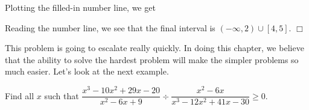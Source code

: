 \documentclass[lang=en,11pt]{elegantbook}
\begin{document}
\begin{solution}
Plotting the filled-in number line, we get 
\begin{figure}[!h]
    \centering
\end{figure}

Reading the number line, we see that the final interval is $(-\infty,2)\cup[4,5]$. $\Box$
\end{solution}
This problem is going to escalate really quickly.  In doing this chapter, we believe that the ability to solve the hardest problem will make the simpler problems so much easier.  Let's look at the next example.
\begin{example}
Find all $x$ such that $\dfrac{x^3-10x^2+29x-20}{x^2-6x+9}\div\dfrac{x^2-6x}{x^3-12x^2+41x-30}\geq 0$.
\end{example}
\end{document}
